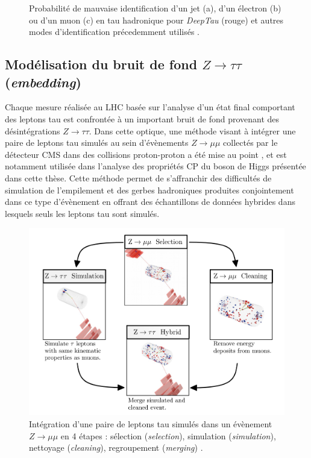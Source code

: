 \begin{figure}
\begin{subfigure}[b]{\linewidth}
        \caption{}
    \end{subfigure}
    \caption{Probabilité de mauvaise identification d'un jet (a), d'un électron (b) ou d'un muon (c) en tau hadronique pour \textit{DeepTau} (rouge) et autres modes d'identification précedemment utilisés \cite{deeptau}.}
    \label{deeptauperf}
\end{figure}

\subsection{Modélisation du bruit de fond $Z\to\tau\tau$ (\textit{embedding})}
\label{embed}

Chaque mesure réalisée au LHC basée sur l'analyse d'un état final comportant des leptons tau est confrontée à un important bruit de fond provenant des désintégrations $Z\rightarrow\tau\tau$. Dans cette optique, une méthode visant à intégrer une paire de leptons tau simulés au sein d'évènements $Z\rightarrow\mu\mu$ collectés par le détecteur CMS dans des collisions proton-proton a été mise au point \cite{Embedding}, et est notamment utilisée dans l'analyse des propriétés CP du boson de Higgs présentée dans cette thèse. Cette méthode permet de s'affranchir des difficultés de simulation de l'empilement et des gerbes hadroniques produites conjointement dans ce type d'évènement en offrant des échantillons de données hybrides dans lesquels seuls les leptons tau sont simulés. \\ 


\begin{figure}
\centering
    \includegraphics[scale=0.38]{Chapitre4/Images/4steps.png} 
    \caption{Intégration d'une paire de leptons tau simulés dans un évènement $Z\rightarrow\mu\mu$ en 4 étapes : sélection (\textit{selection}), simulation (\textit{simulation}), nettoyage (\textit{cleaning}), regroupement (\textit{merging}) \cite{Embedding}.}
    \label{4steps}
\end{figure} 


